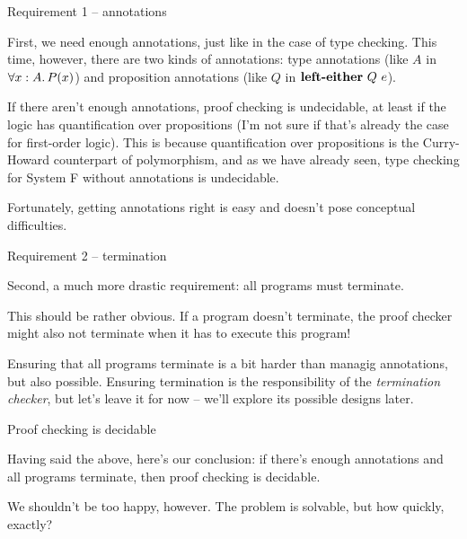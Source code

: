 \documentclass{beamer}
\begin{document}
\begin{frame}{Requirement 1 -- annotations}

First, we need enough annotations, just like in the case of type checking. This time, however, there are two kinds of annotations: type annotations (like $A$ in $\All{x}[A]{P(x)}$) and proposition annotations (like $Q$ in $\orintrol[Q]{e}$).

\vspace{1em}

If there aren't enough annotations, proof checking is undecidable, at least if the logic has quantification over propositions (I'm not sure if that's already the case for first-order logic). This is because quantification over propositions is the Curry-Howard counterpart of polymorphism, and as we have already seen, type checking for System F without annotations is undecidable.

\vspace{1em}

Fortunately, getting annotations right is easy and doesn't pose conceptual difficulties.

\end{frame}

\begin{frame}{Requirement 2 -- termination}

Second, a much more drastic requirement: all programs must terminate.

\vspace{2em}

This should be rather obvious. If a program doesn't terminate, the proof checker might also not terminate when it has to execute this program!

\vspace{2em}

Ensuring that all programs terminate is a bit harder than managig annotations, but also possible. Ensuring termination is the responsibility of the \textit{termination checker}, but let's leave it for now -- we'll explore its possible designs later.

\end{frame}

\begin{frame}{Proof checking is decidable}

Having said the above, here's our conclusion: if there's enough annotations and all programs terminate, then proof checking is decidable.

\vspace{2em}

We shouldn't be too happy, however. The problem is solvable, but how quickly, exactly?

\end{frame}
\end{document}
